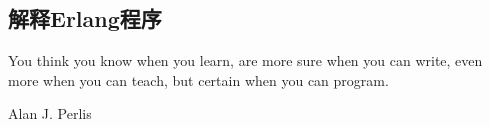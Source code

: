 \documentclass[preview,multi,crop=false,border=1in,class=memoir]{standalone}
\begin{document}
\begin{preview-page}
\chapter{解释Erlang程序}
\epigraph{
You think you know when you learn, are more sure when you can write,
even more when you can teach, but certain when you can program.}{
Alan J. Perlis \cite{Perlis:1982:epigrams}}
\end{preview-page}



\begin{preview-page}
\MakeBib
\end{preview-page}
\end{document}
